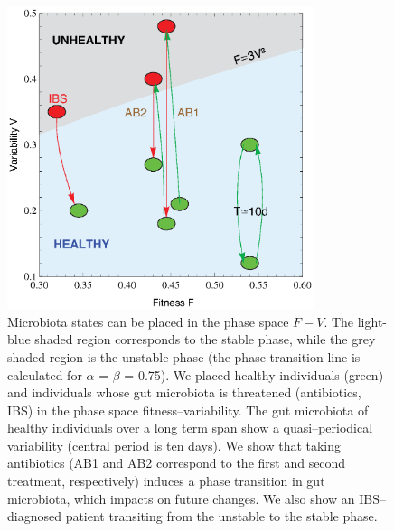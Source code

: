 \begin{figure}
	\centering
	\vspace*{-5mm} %
	\includegraphics[width=0.8\textwidth]{figs/Fig3.eps}
	\caption{Microbiota states can be placed in the phase space $F-V$. The light-blue shaded region corresponds to the stable phase, while the grey shaded region is the unstable phase (the phase transition line is calculated for  $\alpha$ = $\beta$ = 0.75). We placed healthy individuals (green) and individuals whose gut microbiota is threatened (antibiotics, IBS) in the phase space fitness--variability. The gut microbiota of healthy individuals over a long term span show a quasi--periodical variability (central period is ten days). We show that taking antibiotics (AB1 and AB2 correspond to the first and second treatment, respectively) induces a phase transition in gut microbiota, which impacts on future changes. We also show an IBS--diagnosed patient transiting from the unstable to the stable phase.}
	\label{fig:main3}
\end{figure}

